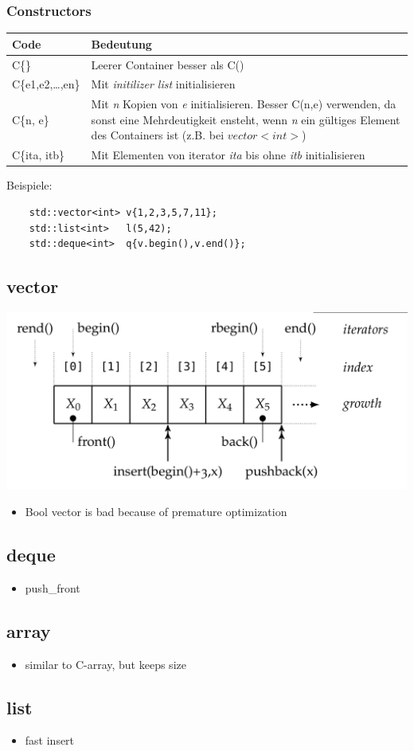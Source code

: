 \subsubsection{Constructors}
	\begin{tabularx}{\columnwidth}{lX}
		Code & Bedeutung \\
		\hline
		C\{\} & Leerer Container besser als C() \\
		C\{e1,e2,\ldots,en\} & Mit \emph{initilizer list} initialisieren \\
		C\{n, e\} & Mit \emph{n} Kopien von \emph{e} initialisieren.  Besser C(n,e) verwenden, da sonst eine Mehrdeutigkeit ensteht, wenn \emph{n} ein gültiges Element des Containers ist (z.B. bei $vector<int>$) \\
		C\{ita, itb\} & Mit Elementen von iterator \emph{ita} bis ohne \emph{itb} initialisieren \\
	\end{tabularx}
	Beispiele:
\begin{lstlisting}
	std::vector<int> v{1,2,3,5,7,11};
	std::list<int>   l(5,42);
	std::deque<int>  q{v.begin(),v.end()};
\end{lstlisting}

\subsection{vector}
\begin{center}
\includegraphics[width=\linewidth]{./bilder/iterators}
\end{center}
\begin{itemize}
\item Bool vector is bad because of premature optimization
\end{itemize}


\subsection{deque}
\begin{itemize}
\item push\_front
\end{itemize}

\subsection{array}
\begin{itemize}
\item similar to C-array, but keeps size
\end{itemize}

\subsection{list}
\begin{itemize}
\item fast insert
\end{itemize}
